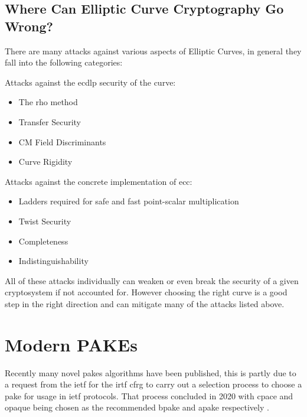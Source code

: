 \subsection{Where Can Elliptic Curve Cryptography Go Wrong?}
There are many attacks against various aspects of Elliptic Curves, in general they fall into the following categories:
\begin{itemize}
  \begin{item}
    Attacks against the \gls{ecdlp} security of the curve:
    \begin{itemize}
      \item{The rho method \cite{pollard-rho}}
      \item{Transfer Security \cite{multiplicative-transfer-attack,additive-transfer-attack}}
      \item{CM Field Discriminants \cite{safecurves}}
      \item{Curve Rigidity \cite{curve-rigidity}}
    \end{itemize}
  \end{item}
  \begin{item}
    Attacks against the concrete implementation of \gls{ecc}:
    \begin{itemize}
      \item{Ladders required for safe and fast point-scalar multiplication \cite{safecurves}}
      \item{Twist Security \cite{small-subgroup-attack,invalid-curve-attack}}
      \item{Completeness \cite{completeness-attack}}
      \item{Indistinguishability \cite{elligator2}}
    \end{itemize}
  \end{item}
\end{itemize}

All of these attacks individually can weaken or even break the security of a given cryptosystem if not accounted for.
However choosing the right curve is a good step in the right direction and can mitigate many of the attacks listed above.

\section{Modern PAKEs}
Recently many novel \glspl{pake} algorithms have been published, this is partly due to a request from the \gls{ietf} for the \gls{irtf} \gls{cfrg} to carry out a selection process to choose a \gls{pake} for usage in \gls{ietf} protocols.
That process concluded in 2020 with \gls{cpace} and \gls{opaque} being chosen as the recommended \gls{bpake} and \gls{apake} respectively \cite{cfrg-pake-selection-results}.

